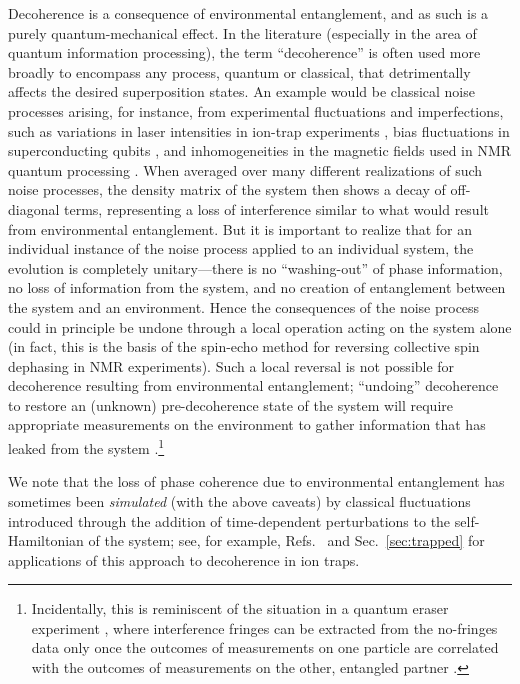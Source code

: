 \documentclass[3p,sort&compress]{elsarticle}
\begin{document}
Decoherence is a consequence of environmental entanglement, and as such is a purely quantum-mechanical effect. In the literature (especially in the area of quantum information processing), the term ``decoherence'' is often used more broadly to encompass any process, quantum or classical, that detrimentally affects the desired superposition states. An example would be classical noise processes arising, for instance, from experimental fluctuations and imperfections, such as variations in laser intensities in ion-trap experiments \cite{Schneider:1998:yz,Miquel:1997:zz}, bias fluctuations in superconducting qubits \cite{Martinis:2003:bz}, and inhomogeneities in the magnetic fields used in NMR quantum processing \cite{Vandersypen:2004:ra}. When averaged over many different realizations of such noise processes, the density matrix of the system then shows a decay of off-diagonal terms, representing a loss of interference similar to what would result from environmental entanglement. But it is important to realize that for an individual instance of the noise process applied to an individual system, the evolution is completely unitary---there is no ``washing-out'' of phase information, no loss of information from the system, and no creation of entanglement between the system and an environment. Hence the consequences of the noise process could in principle be undone through a local operation acting on the system alone (in fact, this is the basis of the spin-echo method for reversing collective spin dephasing in NMR experiments). Such a local reversal is not possible for decoherence resulting from environmental entanglement; ``undoing'' decoherence to restore an (unknown) pre-decoherence state of the system will require appropriate measurements on the environment to gather information that has leaked from the system \cite{Myatt:2000:yy,Zurek:2002:ii}.\footnote{Incidentally, this is reminiscent of the situation in a quantum eraser experiment \cite{Jaynes:1980:lm,Peres:1980:im,Scully:1982:yb,Scully:1991:yb}, where interference fringes can be extracted from the no-fringes data only once the outcomes of measurements on one particle are correlated with the outcomes of measurements on the other, entangled partner \cite{Englert:1999:aq,Ashby:2016:pp}.}

We note that the loss of phase coherence due to environmental entanglement has sometimes been \emph{simulated} (with the above caveats) by classical fluctuations introduced through the addition of time-dependent perturbations to the self-Hamiltonian of the system; see, for example,  Refs.~\cite{Schneider:1998:yz,Schneider:1999:tt,Turchette:2000:aa,Myatt:2000:yy} and Sec.~\ref{sec:trapped} for applications of this approach to decoherence in ion traps.
\end{document}

